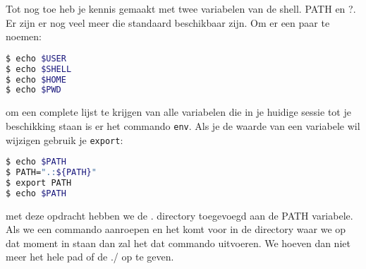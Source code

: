 Tot nog toe heb je kennis gemaakt met twee variabelen van de shell. PATH en ?. Er zijn er nog veel meer die standaard beschikbaar zijn. Om er een paar te noemen:
\begin{lstlisting}[language=bash]
$ echo $USER
$ echo $SHELL
$ echo $HOME
$ echo $PWD
\end{lstlisting}
om een complete lijst te krijgen van alle variabelen die in je huidige sessie tot je beschikking staan is er het commando \texttt{env}.
Als je de waarde van een variabele wil wijzigen gebruik je \texttt{export}:
\begin{lstlisting}[language=bash]
$ echo $PATH
$ PATH=".:${PATH}"
$ export PATH
$ echo $PATH
\end{lstlisting}
met deze opdracht hebben we de . directory toegevoegd aan de PATH variabele. Als we een commando aanroepen en het komt voor in de directory waar we op dat moment in staan dan zal het dat commando uitvoeren. We hoeven dan niet meer het hele pad of de ./ op te geven.
